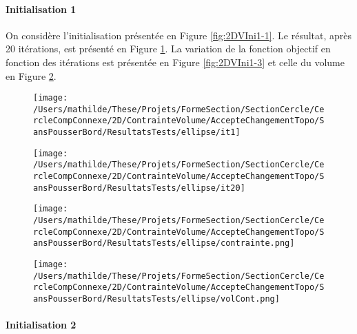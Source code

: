 \documentclass[11pt,a4paper]{article}
\begin{document}
\paragraph{Initialisation 1}

\vspace{0cm}

On considère l'initialisation présentée en Figure \ref{fig:2DVIni1-1}. Le résultat, après 20 itérations, est présenté en Figure \ref{fig:2DVIni1-2}. La variation de la fonction objectif en fonction des itérations est présentée en Figure \ref{fig:2DVIni1-3} et celle du volume en Figure \ref{fig:2DVIni1-4}.

\begin{figure}[H]
	\begin{minipage}{0.48\textwidth}
		\centering
		\texttt{[image: /Users/mathilde/These/Projets/FormeSection/SectionCercle/CercleCompConnexe/2D/ContrainteVolume/AccepteChangementTopo/SansPousserBord/ResultatsTests/ellipse/it1]}
		\label{fig:2DVIni1-1}
	\end{minipage}
	\begin{minipage}{0.48\textwidth}
		\centering
		\texttt{[image: /Users/mathilde/These/Projets/FormeSection/SectionCercle/CercleCompConnexe/2D/ContrainteVolume/AccepteChangementTopo/SansPousserBord/ResultatsTests/ellipse/it20]}
		\label{fig:2DVIni1-2}
	\end{minipage}	
\end{figure}

\begin{figure}[H]
		\begin{minipage}{0.48\textwidth}
			\centering
			\texttt{[image: /Users/mathilde/These/Projets/FormeSection/SectionCercle/CercleCompConnexe/2D/ContrainteVolume/AccepteChangementTopo/SansPousserBord/ResultatsTests/ellipse/contrainte.png]}
			\label{fig:2DVIni1-3}
		\end{minipage}
		\begin{minipage}{0.48\textwidth}
			\centering
			\texttt{[image: /Users/mathilde/These/Projets/FormeSection/SectionCercle/CercleCompConnexe/2D/ContrainteVolume/AccepteChangementTopo/SansPousserBord/ResultatsTests/ellipse/volCont.png]}
			\label{fig:2DVIni1-4}
		\end{minipage}
\end{figure}


\paragraph{Initialisation 2}
\end{document}
